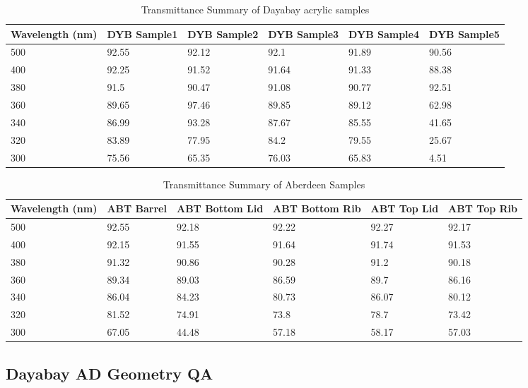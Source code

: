 \begin{table}
\centering
\caption{Transmittance Summary of Dayabay acrylic samples}
\label{tab:summaryDYBTransmittance}
\begin{tabular}{lp{1.5cm}p{1.5cm}p{1.5cm}p{1.5cm}p{1.5cm}}
\hline
Wavelength (nm) & DYB Sample1 & DYB Sample2 & DYB Sample3 & DYB Sample4 & DYB Sample5 \\
\hline
\hline
500 & 92.55 &  92.12 &  92.1  &  91.89 &  90.56 \\
400 & 92.25 &  91.52 &  91.64 &  91.33 &  88.38 \\
380 & 91.5  &  90.47 &  91.08 &  90.77 &  92.51 \\
360 & 89.65 &  97.46 &  89.85 &  89.12 &  62.98 \\
340 & 86.99 &  93.28 &  87.67 &  85.55 &  41.65 \\
320 & 83.89 &  77.95 &  84.2  &  79.55 &  25.67 \\
300 & 75.56 &  65.35 &  76.03 &  65.83 &  4.51  \\
\hline
\end{tabular}
\end{table}



\begin{table}
\centering
\caption{Transmittance Summary of Aberdeen Samples}
\label{tab:summaryABTTransmittance}
\begin{tabular}{lp{1.5cm}p{1.5cm}p{1.5cm}p{1.5cm}p{1.5cm}}
\hline
Wavelength (nm) & ABT Barrel  & ABT Bottom Lid & ABT Bottom Rib &  ABT Top Lid &  ABT Top Rib \\
\hline
\hline
500 & 92.55 &  92.18 &  92.22 &  92.27 &  92.17\\
400 & 92.15 &  91.55 &  91.64 &  91.74 &  91.53\\
380 & 91.32 &  90.86 &  90.28 &  91.2  &  90.18\\
360 & 89.34 &  89.03 &  86.59 &  89.7  &  86.16\\
340 & 86.04 &  84.23 &  80.73 &  86.07 &  80.12\\
320 & 81.52 &  74.91 &  73.8  &  78.7  &  73.42\\
300 & 67.05 &  44.48 &  57.18 &  58.17 &  57.03\\
\end{tabular}
\end{table}





\subsection {Dayabay AD Geometry QA}


